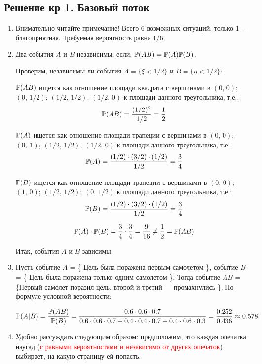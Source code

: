 \documentclass[12pt, a4paper]{article}\usepackage[]{graphicx}\usepackage[]{color}
\begin{document}
\subsection{Решение кр 1. Базовый поток}
\begin{enumerate}
\item Внимательно читайте примечание! Всего 6 возможных ситуаций, только 1 — благоприятная. Требуемая вероятность равна $1/6$.

\item
Два события $A$ и $B$ независимы, если: $\P(AB) = \P(A) \P(B)$.

Проверим, независимы ли события $A = \{ \xi < 1/2 \} $ и  $B = \{ \eta < 1/2 \} $:

$\P(AB)$ ищется как отношение площади квадрата с вершинами в $(0,\,0)$; $(0,\,1/2)$; $(1/2,\,1/2)$; $(1/2,\,0)$ к площади данного треугольника, т.е.:
\[\P(AB) = \frac{(1/2)^2}{1/2}= \frac{1}{2}\]

$\P(A)$ ищется как отношение площади трапеции с вершинами в $(0,\,0)$; $(0,\,1)$; $(1/2,\,1/2)$; $(1/2,\,0)$ к площади данного треугольника, т.е.:
\[\P(A) = \frac{(1/2)\cdot (3/2) \cdot (1/2)}{1/2}= \frac{3}{4}\]

$\P(B)$ ищется как отношение площади трапеции с вершинами в $(0,\,0)$; $(1,\,0)$; $(1/2,\,1/2)$; $(0,\,1/2)$ к площади данного треугольника, т.е.:
\[\P(B) = \frac{(1/2)\cdot (3/2) \cdot (1/2)}{1/2}= \frac{3}{4}\]

\[\P(A)\cdot \P(B) = \frac{3}{4} \cdot  \frac{3}{4} = \frac{9}{16} \ne \frac{1}{2} = \P(AB)\]

Итак, события $A$ и $B$ зависимы.

\item
Пусть событие $A$ = \{ Цель была поражена первым самолетом \}, событие $B$ = \{ Цель была поражена только одним самолетом \}. Тогда событие $AB$ = \{Первый самолет поразил цель, второй и третий — промахнулись  \}. По формуле условной вероятности:

\[\P(A|B) = \frac{\P(AB)}{\P(B)} = \frac{0.6 \cdot 0.6 \cdot 0.7}{0.6\cdot 0.6 \cdot 0.7 + 0.4 \cdot 0.4 \cdot 0.7 + 0.4 \cdot 0.6 \cdot 0.3} = \frac{0.252}{0.436} \approx 0.578\]

\item
Удобно рассуждать следующим образом: предположим, что каждая опечатка наугад (\textcolor{red}{с равными вероятностями и независимо от других опечаток}) выбирает, на какую страницу ей попасть.



\end{enumerate}
\end{document}
